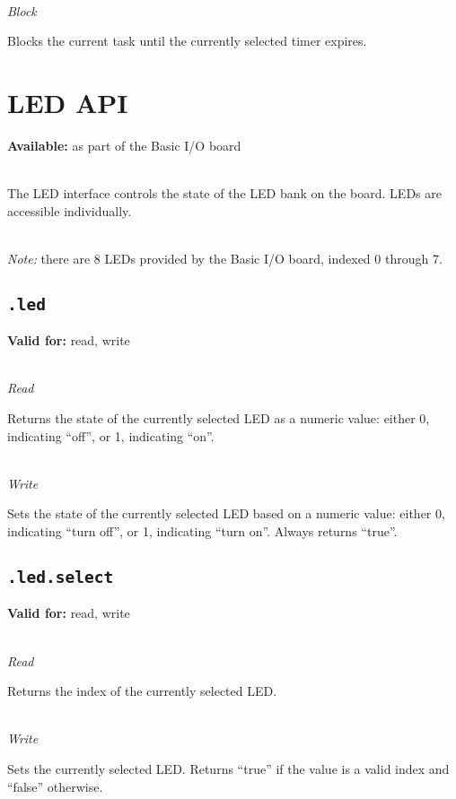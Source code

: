 \documentclass{article}
\begin{document}
~\\
\textit{Block}

Blocks the current task until the currently selected timer expires.

\section{LED API}
\textbf{Available:} as part of the Basic I/O board

~\\
The LED interface controls the state of the LED bank on the board. LEDs are accessible individually. %

~\\
\textit{Note:} there are 8 LEDs provided by the Basic I/O board, indexed 0 through 7.

\subsection{\texttt{.led}}
\textbf{Valid for:} read, write

~\\
\textit{Read}

Returns the state of the currently selected LED as a numeric value: either 0, indicating ``off'', or 1, indicating ``on''.

~\\
\textit{Write}

Sets the state of the currently selected LED based on a numeric value: either 0, indicating ``turn off'', or 1, indicating ``turn on''. Always returns ``true''.

\subsection{\texttt{.led.select}}
\textbf{Valid for:} read, write

~\\
\textit{Read}

Returns the index of the currently selected LED.

~\\
\textit{Write}

Sets the currently selected LED. Returns ``true'' if the value is a valid index and ``false'' otherwise.
\end{document}
